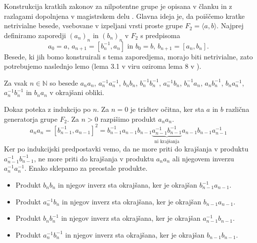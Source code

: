 \documentclass[mat1, tisk]{fmfdelo}
\numberwithin{equation}{section}  %
\begin{document}
Konstrukcija kratkih zakonov za nilpotentne grupe je opisana v članku \cite{Elkasapy_Thom_2013} in z razlagami dopolnjena v magistrskem delu \cite{Schneider_2016}.
Glavna ideja je, da poiščemo kratke netrivialne besede, vsebovane v izpeljani vrsti proste grupe $F_2 = \langle a, b \rangle $. Najprej definiramo zaporedji $(a_n)_n$ in $(b_n)_n$ v $F_2$ s predpisoma
\begin{equation*}
a_0 = a, \, a_{n + 1} = [b_n^{-1}, a_{n}] \text{ in } b_0 = b, \, b_{n + 1} = [a_{n}, b_{n}]. 
\end{equation*}  
Besede, ki jih bomo konstruirali s tema zaporedjema, morajo biti netrivialne, zato potrebujemo naslednjo lemo (lema 3.1 v viru \cite{Kozma_Thom_2016} oziroma lema 8 v \cite{Schneider_2016}).
\begin{lema}
\label{lem_ni_krajsanj_produkti_ab}
Za vsak $n \in  \mathbb{N}$ so besede $a_{n} a_{n}$, $a_{n}^{-1} a_{n}^{-1}$, $b_{n} b_{n}$, $b_{n}^{-1} b_{n}^{-1}$, $a_{n}^{-1} b_{n}$, $b_{n}^{-1} a_{n}$, $a_{n} b_{n}^{-1}$, $b_{n} a_{n}^{-1}$, $a_{n}^{-1} b_{n}^{-1}$ in $b_{n} a_{n}$ v okrajšani obliki.   
\end{lema}
\begin{dokaz}
    Dokaz poteka z indukcijo po $n$. Za $n = 0$ je tridtev očitna, ker sta $a$ in $b$ različna generatorja grupe $F_2$. Za $n > 0$ razpišimo produkt $a_n a_n$.
    \begin{equation*}
    a_{n} a_{n} = [b_{n- 1}^{-1}, a_{n-1}]^2 = b_{n- 1}^{-1} a_{n-1} b_{n- 1} \underbrace{a_{n-1}^{-1} b_{n- 1}^{-1}}_{\text{ni krajšanja}}  a_{n-1} b_{n- 1} a_{n-1}^{-1} 
    \end{equation*}  
    Ker po indukcijski predpostavki vemo, da ne more priti do krajšanja v produktu $a_{n -1}^{-1} b_{n -1}^{-1}$, ne more priti do krajšanja v produktu $a_{n} a_{n}$ ali njegovem inverzu $a_{n}^{-1} a_{n}^{-1}$. Enako sklepamo za preostale produkte.
    \begin{itemize}
        \item Produkt $b_{n} b_{n}$ in njegov inverz sta okrajšana, ker je okrajšan $b_{n - 1}^{-1} a_{n-1}.$
        \item Produkt $a_{n}^{-1} b_{n}$ in njegov inverz sta okrajšana, ker je okrajšan $b_{n - 1} a_{n-1}.$
        \item Produkt $b_{n} b_{n}^{-1}$ in njegov inverz sta okrajšana, ker je okrajšan $a_{n - 1}^{-1} b_{n-1}.$
        \item Produkt $a_{n}^{-1} b_{n}^{-1}$ in njegov inverz sta okrajšana, ker je okrajšan $b_{n - 1} b_{n-1}.$
    \end{itemize}     
\end{dokaz}
\end{document}
